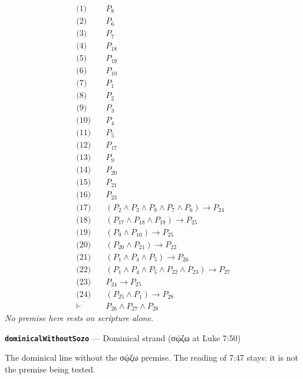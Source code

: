 \documentclass[11pt]{article}
\begin{document}
\begin{align*}
  \text{(1)} \quad & P_{8} \\
  \text{(2)} \quad & P_{6} \\
  \text{(3)} \quad & P_{7} \\
  \text{(4)} \quad & P_{18} \\
  \text{(5)} \quad & P_{19} \\
  \text{(6)} \quad & P_{10} \\
  \text{(7)} \quad & P_{1} \\
  \text{(8)} \quad & P_{2} \\
  \text{(9)} \quad & P_{3} \\
  \text{(10)} \quad & P_{4} \\
  \text{(11)} \quad & P_{5} \\
  \text{(12)} \quad & P_{17} \\
  \text{(13)} \quad & P_{9} \\
  \text{(14)} \quad & P_{20} \\
  \text{(15)} \quad & P_{21} \\
  \text{(16)} \quad & P_{23} \\
  \text{(17)} \quad & (P_{2} \land P_{3} \land P_{8} \land P_{7} \land P_{6}) \rightarrow P_{24} \\
  \text{(18)} \quad & (P_{17} \land P_{18} \land P_{19}) \rightarrow P_{25} \\
  \text{(19)} \quad & (P_{9} \land P_{10}) \rightarrow P_{25} \\
  \text{(20)} \quad & (P_{20} \land P_{21}) \rightarrow P_{22} \\
  \text{(21)} \quad & (P_{1} \land P_{4} \land P_{5}) \rightarrow P_{26} \\
  \text{(22)} \quad & (P_{1} \land P_{4} \land P_{5} \land P_{22} \land P_{23}) \rightarrow P_{27} \\
  \text{(23)} \quad & P_{24} \rightarrow P_{25} \\
  \text{(24)} \quad & (P_{25} \land P_{1}) \rightarrow P_{28} \\
  \vdash \quad & P_{26} \land P_{27} \land P_{28}
\end{align*}
\emph{No premise here rests on scripture alone.}
\par\medskip\noindent\textbf{\texttt{dominical\allowbreak{}Without\allowbreak{}Sozo}} --- Dominical strand (σῴζω at Luke 7:50)\par\nobreak\noindent
The dominical line without the σῴζω premise. The reading of 7:47 stays: it is not the premise being tested.
\end{document}
